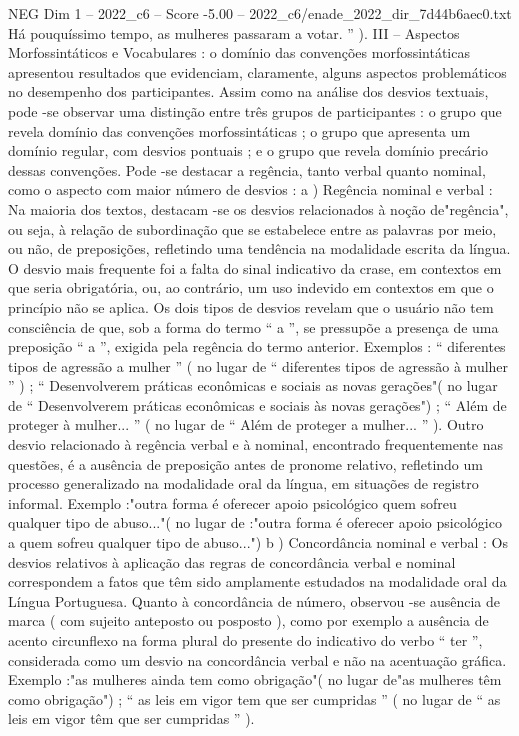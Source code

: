 \begin{textsample}{NEG Dim 1 – 2022\_c6 – Score -5.00 – 2022\_c6/enade\_2022\_dir\_7d44b6aec0.txt}
Há pouquíssimo tempo, as mulheres passaram a votar. ” ).
III – Aspectos Morfossintáticos e Vocabulares : o domínio das convenções morfossintáticas apresentou resultados que evidenciam, claramente, alguns aspectos problemáticos no desempenho dos participantes.
Assim como na análise dos desvios textuais, pode -se observar uma distinção entre três grupos de participantes : o grupo que revela domínio das convenções morfossintáticas ; o grupo que apresenta um domínio regular, com desvios pontuais ; e o grupo que revela domínio precário dessas convenções.
Pode -se destacar a regência, tanto verbal quanto nominal, como o aspecto com maior número de desvios : a ) Regência nominal e verbal : Na maioria dos textos, destacam -se os desvios relacionados à noção de"regência", ou seja, à relação de subordinação que se estabelece entre as palavras por meio, ou não, de preposições, refletindo uma tendência na modalidade escrita da língua.
O desvio mais frequente foi a falta do sinal indicativo da crase, em contextos em que seria obrigatória, ou, ao contrário, um uso indevido em contextos em que o princípio não se aplica.
Os dois tipos de desvios revelam que o usuário não tem consciência de que, sob a forma do termo “ a ”, se pressupõe a presença de uma preposição “ a ”, exigida pela regência do termo anterior.
Exemplos : “ diferentes tipos de agressão a mulher ” ( no lugar de “ diferentes tipos de agressão à mulher ” ) ; “ Desenvolverem práticas econômicas e sociais as novas gerações"( no lugar de “ Desenvolverem práticas econômicas e sociais às novas gerações") ; “ Além de proteger à mulher... ” ( no lugar de “ Além de proteger a mulher... ” ).
Outro desvio relacionado à regência verbal e à nominal, encontrado frequentemente nas questões, é a ausência de preposição antes de pronome relativo, refletindo um processo generalizado na modalidade oral da língua, em situações de registro informal.
Exemplo :"outra forma é oferecer apoio psicológico quem sofreu qualquer tipo de abuso..."( no lugar de :"outra forma é oferecer apoio psicológico a quem sofreu qualquer tipo de abuso...") b ) Concordância nominal e verbal : Os desvios relativos à aplicação das regras de concordância verbal e nominal correspondem a fatos que têm sido amplamente estudados na modalidade oral da Língua Portuguesa.
Quanto à concordância de número, observou -se ausência de marca ( com sujeito anteposto ou posposto ), como por exemplo a ausência de acento circunflexo na forma plural do presente do indicativo do verbo “ ter ”, considerada como um desvio na concordância verbal e não na acentuação gráfica.
Exemplo :"as mulheres ainda tem como obrigação"( no lugar de"as mulheres têm como obrigação") ; “ as leis em vigor tem que ser cumpridas ” ( no lugar de “ as leis em vigor têm que ser cumpridas ” ).

\end{textsample}
